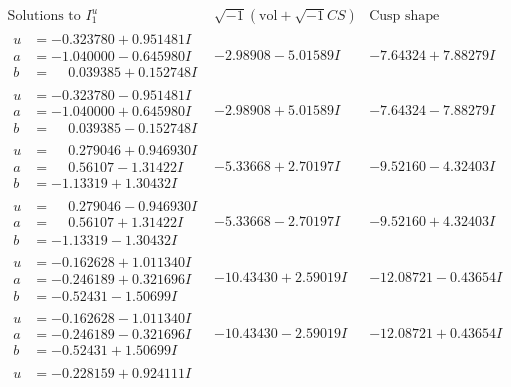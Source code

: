 \documentclass[1p]{elsarticle_modified}
\theoremstyle{definition}
\newcommand{\I}{\sqrt{-1}}
\begin{document}
$$\begin{array}{c|c|c}  
\text{Solutions to }I^u_{1}& \I (\text{vol} + \sqrt{-1}CS) & \text{Cusp shape}\\
 \hline 
\begin{aligned}
u &= -0.323780 + 0.951481 I \\
a &= -1.040000 - 0.645980 I \\
b &= \phantom{-}0.039385 + 0.152748 I\end{aligned}
 & -2.98908 - 5.01589 I & -7.64324 + 7.88279 I \\ \hline\begin{aligned}
u &= -0.323780 - 0.951481 I \\
a &= -1.040000 + 0.645980 I \\
b &= \phantom{-}0.039385 - 0.152748 I\end{aligned}
 & -2.98908 + 5.01589 I & -7.64324 - 7.88279 I \\ \hline\begin{aligned}
u &= \phantom{-}0.279046 + 0.946930 I \\
a &= \phantom{-}0.56107 - 1.31422 I \\
b &= -1.13319 + 1.30432 I\end{aligned}
 & -5.33668 + 2.70197 I & -9.52160 - 4.32403 I \\ \hline\begin{aligned}
u &= \phantom{-}0.279046 - 0.946930 I \\
a &= \phantom{-}0.56107 + 1.31422 I \\
b &= -1.13319 - 1.30432 I\end{aligned}
 & -5.33668 - 2.70197 I & -9.52160 + 4.32403 I \\ \hline\begin{aligned}
u &= -0.162628 + 1.011340 I \\
a &= -0.246189 + 0.321696 I \\
b &= -0.52431 - 1.50699 I\end{aligned}
 & -10.43430 + 2.59019 I & -12.08721 - 0.43654 I \\ \hline\begin{aligned}
u &= -0.162628 - 1.011340 I \\
a &= -0.246189 - 0.321696 I \\
b &= -0.52431 + 1.50699 I\end{aligned}
 & -10.43430 - 2.59019 I & -12.08721 + 0.43654 I \\ \hline\begin{aligned}
u &= -0.228159 + 0.924111 I \\

\end{aligned}
\end{array}$$
\end{document}
